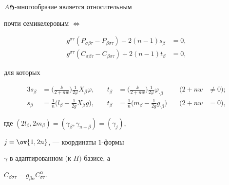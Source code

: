 \begin{thm} $A\frak H$-многообразие является относительным 


почти семикелеровым $\Longleftrightarrow$ 


\begin{align} 


g^{\sigma\tau}(P_{\sigma\beta\tau}- 


P_{\beta\sigma\tau})-2(n-1)s_\beta&=0,\\ 


g^{\sigma\tau}(C_{\sigma\beta\tau}- 


C_{\beta\sigma\tau})+2(n-1)t_\beta&=0, 


\end{align} 


для которых 


\begin{alignat*}{3} 


s_\beta&=\bigg(\frac{k}{2+nw}\bigg)\frac{1}{2\varphi} 


X_\beta\varphi, &\quad t_\beta&=\bigg( 


\frac{k}{2+nw}\bigg)\frac{1}{2\varphi}\varphi_{\cdot\beta} 


&\quad (2+nw&\ne 0);\\ 


s_\beta&=\frac{1}{n}\bigg(l_\beta-\frac{1}{2g} 


X_\beta g\bigg), &\quad t_\beta&=\frac{1}{n}\bigg( 


m_\beta-\frac{1}{2g}g_{\cdot\beta}\bigg) &\quad 


(2+nw&=0),


\end{alignat*} 


где $(2l_\beta,2m_\beta)=(\gamma_\beta,\gamma_{n+\beta})=(\gamma_j)$, 


$j=\ov{1,2n}$, --- координаты $1$-формы 


$\gamma$ в адаптированном $($к $H)$ базисе, а 


$C_{\beta\sigma\tau}=g_{\beta\alpha}C^\alpha_{\sigma\tau}$. 


\end{thm} 


 


